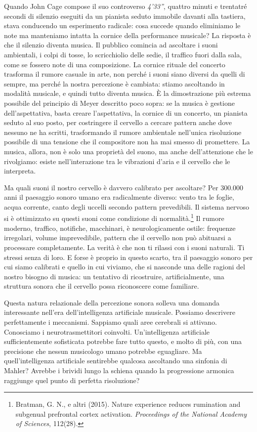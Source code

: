 Quando John Cage compose il suo controverso \textit{4'33''}, quattro minuti e trentatr\'{e} secondi di silenzio eseguiti da un pianista seduto immobile davanti alla tastiera, stava conducendo un esperimento radicale: cosa succede quando eliminiamo le note ma manteniamo intatta la cornice della performance musicale? La risposta \`{e} che il silenzio diventa musica. Il pubblico comincia ad ascoltare i suoni ambientali, i colpi di tosse, lo scricchiolio delle sedie, il traffico fuori dalla sala, come se fossero note di una composizione. La cornice rituale del concerto trasforma il rumore casuale in arte, non perch\'{e} i suoni siano diversi da quelli di sempre, ma perch\'{e} la nostra percezione \`{e} cambiata: stiamo ascoltando in modalit\`{a} musicale, e quindi tutto diventa musica. \`{E} la dimostrazione pi\`{u} estrema possibile del principio di Meyer descritto poco sopra: se la musica \`{e} gestione dell'aspettativa, basta creare l'aspettativa, la cornice di un concerto, un pianista seduto al suo posto, per costringere il cervello a cercare pattern anche dove nessuno ne ha scritti, trasformando il rumore ambientale nell'unica risoluzione possibile di una tensione che il compositore non ha mai smesso di promettere. La musica, allora, non \`{e} solo una propriet\`{a} del suono, ma anche dell'attenzione che le rivolgiamo: esiste nell'interazione tra le vibrazioni d'aria e il cervello che le interpreta.

Ma quali suoni il nostro cervello \`{e} davvero calibrato per ascoltare? Per 300.000 anni il paesaggio sonoro umano era radicalmente diverso: vento tra le foglie, acqua corrente, canto degli uccelli secondo pattern prevedibili. Il sistema nervoso si \`{e} ottimizzato su questi suoni come condizione di normalit\`{a}.\footnote{Bratman, G. N., e altri (2015). Nature experience reduces rumination and subgenual prefrontal cortex activation. \textit{Proceedings of the National Academy of Sciences}, 112(28).} Il rumore moderno, traffico, notifiche, macchinari, \`{e} neurologicamente ostile: frequenze irregolari, volume imprevedibile, pattern che il cervello non pu\`{o} abituarsi a processare completamente. La verit\`{a} \`{e} che non ti rilassi con i suoni naturali. Ti stressi senza di loro. E forse \`{e} proprio in questo scarto, tra il paesaggio sonoro per cui siamo calibrati e quello in cui viviamo, che si nasconde una delle ragioni del nostro bisogno di musica: un tentativo di ricostruire, artificialmente, una struttura sonora che il cervello possa riconoscere come familiare.

Questa natura relazionale della percezione sonora solleva una domanda interessante nell'era dell'intelligenza artificiale musicale. Possiamo descrivere perfettamente i meccanismi. Sappiamo quali aree cerebrali si attivano. Conosciamo i neurotrasmettitori coinvolti. Un'intelligenza artificiale sufficientemente sofisticata potrebbe fare tutto questo, e molto di pi\`{u}, con una precisione che nessun musicologo umano potrebbe eguagliare. Ma quell'intelligenza artificiale sentirebbe qualcosa ascoltando una sinfonia di Mahler? Avrebbe i brividi lungo la schiena quando la progressione armonica raggiunge quel punto di perfetta risoluzione?

